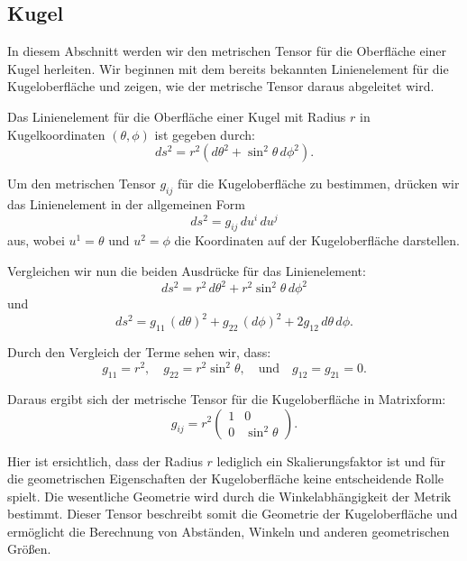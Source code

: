 %
%
%
%
\subsection{Kugel\label{geodaeten:section:MetrischerTensor:Kugel}}

In diesem Abschnitt werden wir den metrischen Tensor für die Oberfläche einer Kugel herleiten.
Wir beginnen mit dem bereits bekannten Linienelement für die Kugeloberfläche und zeigen, wie der metrische Tensor daraus abgeleitet wird.

Das Linienelement für die Oberfläche einer Kugel mit Radius $r$ in Kugelkoordinaten $(\theta, \phi)$ ist gegeben durch:
\begin{equation}
	ds^2 = r^2 \left( d\theta^2 + \sin^2\theta \, d\phi^2 \right).
\end{equation}

Um den metrischen Tensor $g_{ij}$ für die Kugeloberfläche zu bestimmen, drücken wir das Linienelement in der allgemeinen Form
\begin{equation}
	ds^2 = g_{ij} \, du^i \, du^j
\end{equation}
aus, wobei $u^1 = \theta$ und $u^2 = \phi$ die Koordinaten auf der Kugeloberfläche darstellen.

Vergleichen wir nun die beiden Ausdrücke für das Linienelement:
\begin{equation}
	ds^2 = r^2 \, d\theta^2 + r^2 \sin^2\theta \, d\phi^2
\end{equation}
und
\begin{equation}
	ds^2 = g_{11} \, (d\theta)^2 + g_{22} \, (d\phi)^2 + 2g_{12} \, d\theta \, d\phi.
\end{equation}

Durch den Vergleich der Terme sehen wir, dass:
\begin{equation}
	g_{11} = r^2, \quad g_{22} = r^2 \sin^2\theta, \quad \text{und} \quad g_{12} = g_{21} = 0.
\end{equation}

Daraus ergibt sich der metrische Tensor für die Kugeloberfläche in Matrixform:
\begin{equation}
	g_{ij} = r^2 \begin{pmatrix}
		1 & 0 \\
		0 & \sin^2\theta
	\end{pmatrix}.
\end{equation}

Hier ist ersichtlich, dass der Radius $r$ lediglich ein Skalierungsfaktor ist und für die geometrischen Eigenschaften der Kugeloberfläche keine entscheidende Rolle spielt. 
Die wesentliche Geometrie wird durch die Winkelabhängigkeit der Metrik bestimmt.
Dieser Tensor beschreibt somit die Geometrie der Kugeloberfläche und ermöglicht die Berechnung von Abständen, Winkeln und anderen geometrischen Größen.





